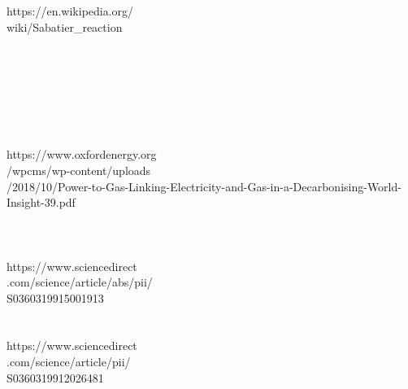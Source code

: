 \documentclass[11pt,a4paper]{article}
\begin{document}
\begin{parcolumns}[colwidths={1=2.5 cm, 2=10 cm, 3=2.5 cm}]{3}
{https://en.wikipedia.org/\\wiki/Sabatier\_reaction
\\ \\ \\ \\ \\ \\ \\ \\
https://www.oxfordenergy.org\\/wpcms/wp-content/uploads\\/2018/10/Power-to-Gas-Linking-Electricity-and-Gas-in-a-Decarbonising-World-Insight-39.pdf
\\ \\ \\ \\
https://www.sciencedirect\\.com/science/article/abs/pii/\\S0360319915001913
\\ \\ \\
https://www.sciencedirect\\.com/science/article/pii/\\S0360319912026481
}
\end{parcolumns}
\end{document}

